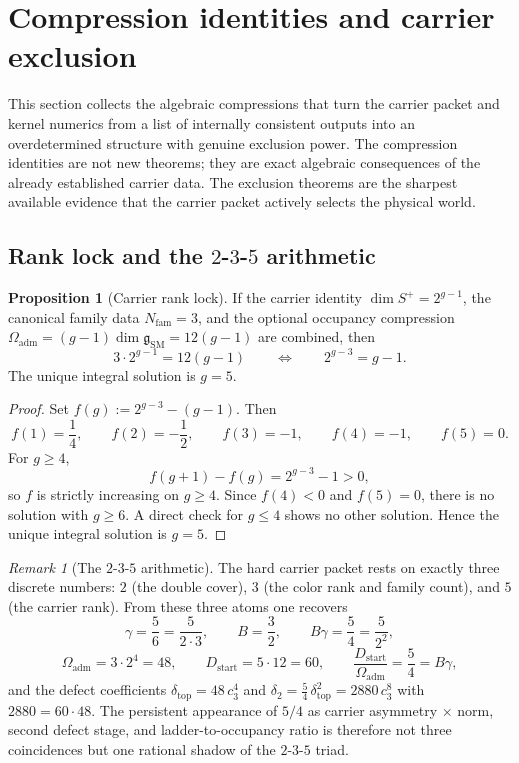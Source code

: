 \documentclass[11pt,a4paper]{article}
\theoremstyle{definition}
\newtheorem{proposition}[theorem]{Proposition}
\theoremstyle{remark}
\newtheorem*{remark}{Remark}
\newcommand{\cthree}{c_3}
\newcommand{\deltatop}{\delta_{\mathrm{top}}}
\newcommand{\SM}{\mathrm{SM}}
\newcommand{\Oadm}{\Omega_{\mathrm{adm}}}
\newcommand{\Dstart}{D_{\mathrm{start}}}
\begin{document}
\section{Compression identities and carrier exclusion}

This section collects the algebraic compressions that turn the carrier packet and kernel numerics from a list of internally consistent outputs into an overdetermined structure with genuine exclusion power. The compression identities are not new theorems; they are exact algebraic consequences of the already established carrier data. The exclusion theorems are the sharpest available evidence that the carrier packet actively selects the physical world.

\subsection{Rank lock and the \texorpdfstring{$2$-$3$-$5$}{2-3-5} arithmetic}

\begin{proposition}[Carrier rank lock]
\label{prop:rank-lock}
If the carrier identity $\dim S^+=2^{g-1}$, the canonical family data $N_{\mathrm{fam}}=3$, and the optional occupancy compression $\Oadm=(g-1)\dim\mathfrak g_{\SM}=12(g-1)$ are combined, then
\begin{equation}
\label{eq:rank-lock}
3\cdot 2^{g-1}=12(g-1)
\qquad\Longleftrightarrow\qquad
2^{g-3}=g-1.
\end{equation}
The unique integral solution is $g=5$.
\end{proposition}

\begin{proof}
Set $f(g):=2^{g-3}-(g-1)$. Then
\[
f(1)=\frac14,\qquad
f(2)=-\frac12,\qquad
f(3)=-1,\qquad
f(4)=-1,\qquad
f(5)=0.
\]
For $g\ge 4$,
\[
f(g+1)-f(g)=2^{g-3}-1>0,
\]
so $f$ is strictly increasing on $g\ge 4$. Since $f(4)<0$ and $f(5)=0$, there is no solution with $g\ge 6$. A direct check for $g\le 4$ shows no other solution. Hence the unique integral solution is $g=5$.
\end{proof}

\begin{remark}[The $2$-$3$-$5$ arithmetic]
The hard carrier packet rests on exactly three discrete numbers: $2$ (the double cover), $3$ (the color rank and family count), and $5$ (the carrier rank). From these three atoms one recovers
\[
\gamma=\frac{5}{6}=\frac{5}{2\cdot 3},
\qquad
B=\frac{3}{2},
\qquad
B\gamma=\frac{5}{4}=\frac{5}{2^2},
\]
\[
\Oadm=3\cdot 2^4=48,
\qquad
\Dstart=5\cdot 12=60,
\qquad
\frac{\Dstart}{\Oadm}=\frac{5}{4}=B\gamma,
\]
and the defect coefficients $\deltatop=48\,\cthree^4$ and $\delta_2=\frac54\,\deltatop^2=2880\,\cthree^8$ with $2880=60\cdot 48$.
The persistent appearance of $5/4$ as carrier asymmetry $\times$ norm, second defect stage, and ladder-to-occupancy ratio is therefore not three coincidences but one rational shadow of the $2$-$3$-$5$ triad.
\end{remark}
\end{document}
